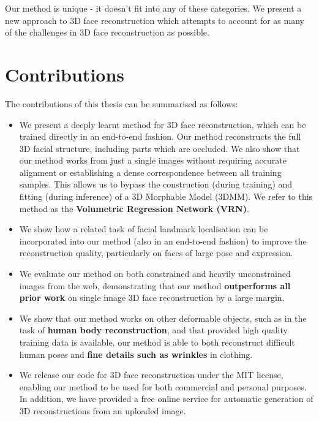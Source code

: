 Our method is unique - it doesn't fit into any of these categories. We
present a new approach to 3D face reconstruction which attempts to
account for as many of the challenges in 3D face reconstruction as
possible.

\section{Contributions}

The contributions of this thesis can be summarised as follows:

\begin{itemize}
\item %
  We present a deeply learnt method for 3D face reconstruction, which
  can be trained directly in an end-to-end fashion. Our method
  reconstructs the full 3D facial structure, including parts which are
  occluded. We also show that our method works from just a single
  images without requiring accurate alignment or establishing a dense
  correspondence between all training samples.  This allows us to
  bypass the construction (during training) and fitting (during
  inference) of a 3D Morphable Model (3DMM).  We refer to this method
  as the \textbf{Volumetric Regression Network (VRN)}.

\item We show how a related task of facial landmark localisation can
  be incorporated into our method (also in an end-to-end fashion) to
  improve the reconstruction quality, particularly on faces of large
  pose and expression.

\item We evaluate our method on both constrained and heavily
  unconstrained images from the web, demonstrating that our method
  \textbf{outperforms all prior work} on single image 3D face
  reconstruction by a large margin.

\item We show that our method works on other deformable objects, such
  as in the task of \textbf{human body reconstruction}, and that
  provided high quality training data is available, our method is able
  to both reconstruct difficult human poses and \textbf{fine details
    such as wrinkles} in clothing.

\item We release our code for 3D face reconstruction under the MIT
  license, enabling our method to be used for both commercial and
  personal purposes. In addition, we have provided a free online
  service for automatic generation of 3D reconstructions from an
  uploaded image.
\end{itemize}

